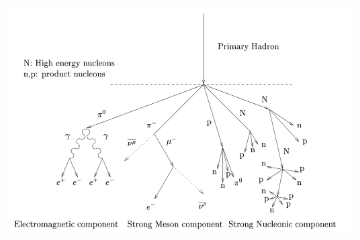 \begin{figure}
	\centering
	\begin{subfigure}{.7\textwidth}
  		\centering
  		\includegraphics[width=\linewidth]{images/hadron_shower_illustration.png}
	\end{subfigure}%
	\begin{subfigure}{.3\textwidth}
 		\centering

\end{subfigure}
\end{figure}
